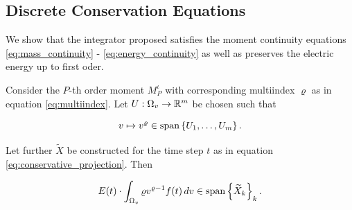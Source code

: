 \subsection{Discrete Conservation Equations}

We show that the integrator proposed satisfies the moment continuity equations 
\ref{eq:mass_continuity} - \ref{eq:energy_continuity} as well as preserves the 
electric energy up to first oder. 

\iffalse
\begin{lemma}\label{lem:conservation}
    Consider the $P$-th order moment $M_P^\iota$ with corresponding 
    multiindex $\varrho$ as in equation \ref{eq:multiindex}.
    Let $U : \Omega_v \to \mathbb{R}^m$ be chosen such that 

    \begin{equation}
        v \mapsto v^\varrho \in \text{span} \left\{ U_1, \ldots, U_m \right\} . 
    \end{equation}
 
    Let further $\widetilde{ X }$ be constructed for the time step $t$ as in equation 
    \ref{eq:conservative_projection}.  Then 

    \begin{equation}
        E(t) \cdot \int_{\Omega_v} \varrho v^{\varrho - 1} f(t) \,dv 
        \in \text{span} \left\{ \widetilde{ X }_k \right\}_k . 
    \end{equation}
\end{lemma}

